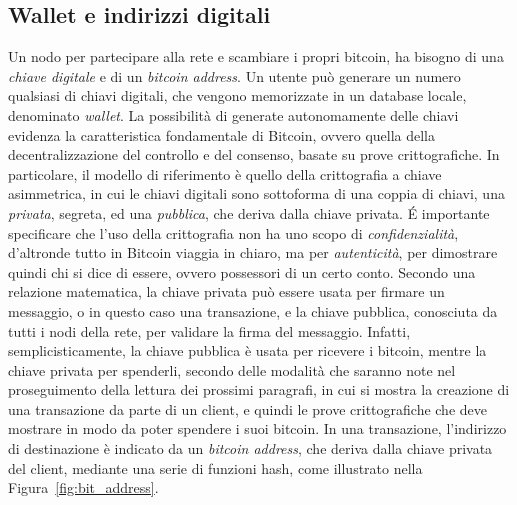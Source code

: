 \subsection{Wallet e indirizzi digitali}
Un nodo per partecipare alla rete e scambiare i propri bitcoin, ha bisogno di una \emph{chiave digitale} e di un \emph{bitcoin address}. Un utente può generare un numero qualsiasi di chiavi digitali, che vengono memorizzate in un database locale, denominato \emph{wallet}.
La possibilità di generate autonomamente delle chiavi evidenza la caratteristica fondamentale di Bitcoin, ovvero quella della decentralizzazione del controllo e del consenso, basate su prove crittografiche.
In particolare, il modello di riferimento è quello della crittografia a chiave asimmetrica, in cui le chiavi digitali sono sottoforma di una coppia di chiavi, una \emph{privata}, segreta, ed una \emph{pubblica}, che deriva dalla chiave privata. \'E importante specificare che l'uso della crittografia non ha uno scopo di \emph{confidenzialità}, d'altronde tutto in Bitcoin viaggia in chiaro, ma per \emph{autenticità}, per dimostrare quindi chi si dice di essere, ovvero possessori di un certo conto.
Secondo una relazione matematica, la chiave privata può essere usata per firmare un messaggio, o in questo caso una transazione,  e la chiave pubblica, conosciuta da tutti i nodi della rete, per validare la firma del messaggio. Infatti, semplicisticamente, la chiave pubblica è usata per ricevere i bitcoin, mentre la chiave privata per spenderli, secondo delle modalità che saranno note nel proseguimento della lettura dei prossimi paragrafi, in cui si mostra la creazione di una transazione da parte di un client, e quindi le prove crittografiche che deve mostrare in modo da poter spendere i suoi bitcoin.
In una transazione, l'indirizzo di destinazione è indicato da un \emph{bitcoin address}, che deriva dalla chiave privata del client, mediante una serie di funzioni hash, come illustrato nella Figura~\ref{fig:bit_address}.

